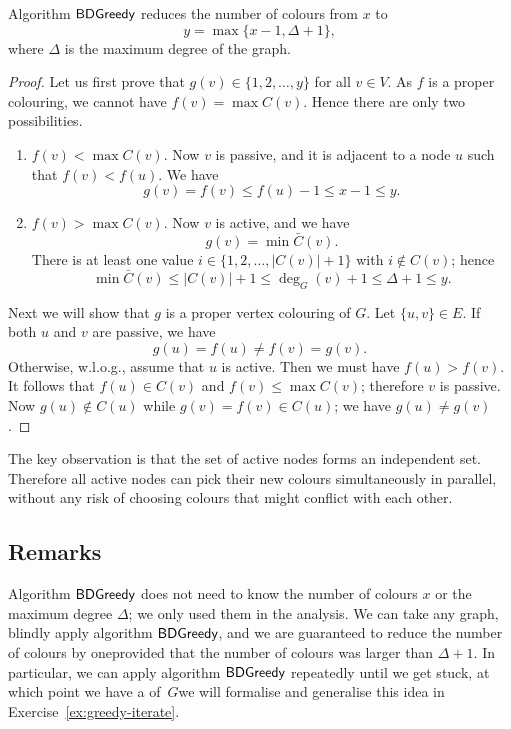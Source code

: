 \begin{lemma}
    Algorithm $\textup{\sffamily BDGreedy}$ reduces the number of colours from $x$ to
    \[
        y = \max \{ x-1, \Delta+1 \},
    \]
    where $\Delta$ is the maximum degree of the graph.
\end{lemma}
\begin{proof}
    Let us first prove that $g(v) \in \{1,2,\dotsc,y\}$ for all $v \in V$. As $f$ is a proper colouring, we cannot have $f(v) = \max C(v)$. Hence there are only two possibilities.
    \begin{enumerate}
        \item $f(v) < \max C(v)$. Now $v$ is passive, and it is adjacent to a node $u$ such that $f(v) < f(u)$. We have
        \[
            g(v) = f(v) \le f(u) - 1 \le x - 1 \le y.
        \]
        \item $f(v) > \max C(v)$. Now $v$ is active, and we have
        \[
            g(v) = \min \bar{C}(v).
        \]
        There is at least one value $i \in \{1,2,\dotsc,|C(v)|+1\}$ with $i \notin C(v)$; hence
        \[
            \min \bar{C}(v) \le |C(v)| + 1 \le \deg_G(v) + 1 \le \Delta + 1 \le y.
        \]
    \end{enumerate}
    
    Next we will show that $g$ is a proper vertex colouring of $G$. Let $\{u,v\} \in E$. If both $u$ and $v$ are passive, we have
    \[
        g(u) = f(u) \ne f(v) = g(v).
    \]
    Otherwise, w.l.o.g., assume that $u$ is active. Then we must have $f(u) > f(v)$. It follows that $f(u) \in C(v)$ and $f(v) \le \max C(v)$; therefore $v$ is passive. Now
    $g(u) \notin C(u)$ while
    $g(v) = f(v) \in C(u)$; we have $g(u) \ne g(v)$.
\end{proof}

The key observation is that the set of active nodes forms an independent set. Therefore all active nodes can pick their new colours simultaneously in parallel, without any risk of choosing colours that might conflict with each other.

\subsection{Remarks}

Algorithm $\textup{\sffamily BDGreedy}$ does not need to know the number of colours $x$ or the maximum degree $\Delta$; we only used them in the analysis. We can take any graph, blindly apply algorithm $\textup{\sffamily BDGreedy}$, and we are guaranteed to reduce the number of colours by one\mydash provided that the number of colours was larger than $\Delta + 1$. In particular, we can apply algorithm $\textup{\sffamily BDGreedy}$ repeatedly until we get stuck, at which point we have a \Dpocol{} of~$G$\mydash we will formalise and generalise this idea in Exercise~\ref{ex:greedy-iterate}.


